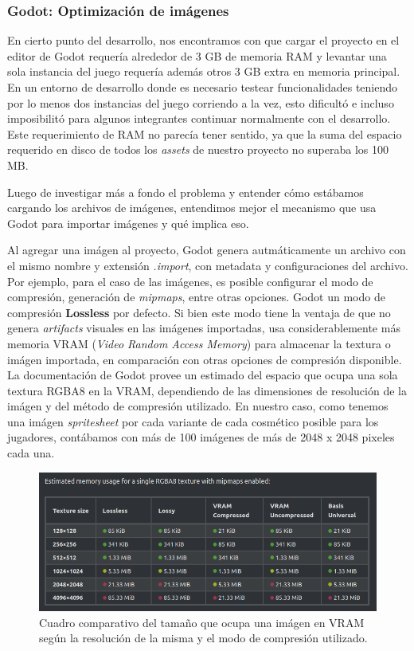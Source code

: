 \subsubsection{Godot: Optimización de imágenes}

En cierto punto del desarrollo, nos encontramos con que cargar el proyecto en el editor de Godot
requería alrededor de 3 GB de memoria RAM y levantar una sola instancia del juego requería además
otros 3 GB extra en memoria principal. En un entorno de desarrollo donde es necesario testear
funcionalidades teniendo por lo menos dos instancias del juego corriendo a la vez, esto dificultó e incluso
imposibilitó para algunos integrantes continuar normalmente con el desarrollo. Este requerimiento
de RAM no parecía tener sentido, ya que la suma del espacio requerido en disco de todos los 
\textit{assets} de nuestro proyecto no superaba los 100 MB.

Luego de investigar más a fondo el problema y entender cómo estábamos cargando los archivos de imágenes,
entendimos mejor el mecanismo que usa Godot para importar imágenes y qué implica eso.

Al agregar una imágen al proyecto, Godot genera autmáticamente un archivo con el mismo nombre y extensión 
\textit{.import}, con metadata y configuraciones del archivo. 
Por ejemplo, para el caso de las imágenes, es posible configurar el modo de compresión, generación de 
\textit{mipmaps}, entre otras opciones. Godot un modo de compresión \textbf{Lossless} por defecto. 
Si bien este modo tiene la ventaja de que no genera \textit{artifacts} visuales en las imágenes importadas, usa 
considerablemente más memoria VRAM (\textit{Video Random Access Memory}) para almacenar la textura o
imágen importada, en comparación con otras opciones de compresión disponible.
La documentación de Godot\cite{ref2} provee un estimado del espacio que ocupa una sola textura
RGBA8 en la VRAM, dependiendo de las dimensiones de resolución de la imágen y del método de compresión utilizado.
En nuestro caso, como tenemos una imágen \textit{spritesheet} por cada variante de cada cosmético posible para los jugadores,
contábamos con más de 100 imágenes de más de 2048 x 2048 pixeles cada una. 

\begin{figure}[htbp]
    \centering
    \includegraphics[width=1.0\textwidth]{../assets/godot-docs-images.png}
    \caption{Cuadro comparativo del tamaño que ocupa una imágen en VRAM según la resolución
             de la misma y el modo de compresión utilizado.}
\end{figure}

